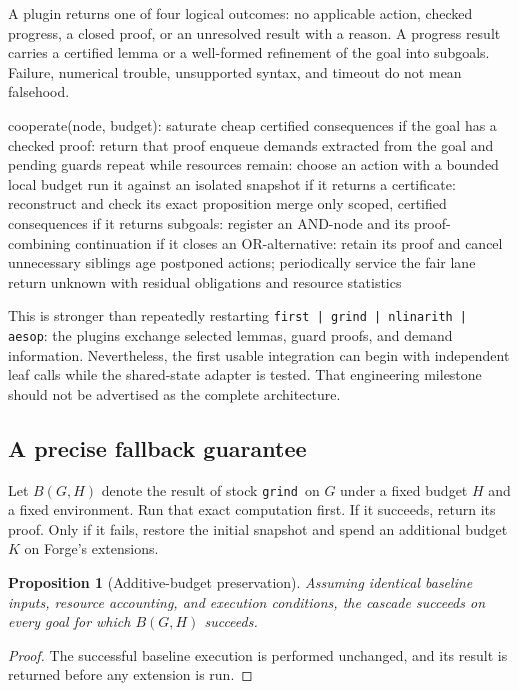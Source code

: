 \documentclass[11pt,a4paper]{article}
\newcommand{\grind}{\texttt{grind}}
\newcommand{\code}[1]{\texttt{\small #1}}
\newtheorem{proposition}{Proposition}[section]
\begin{document}
A plugin returns one of four logical outcomes: no applicable action, checked
progress, a closed proof, or an unresolved result with a reason. A progress
result carries a certified lemma or a well-formed refinement of the goal into
subgoals. Failure, numerical trouble, unsupported syntax, and timeout do not
mean falsehood.

\begin{Code}
cooperate(node, budget):
  saturate cheap certified consequences
  if the goal has a checked proof: return that proof
  enqueue demands extracted from the goal and pending guards
  repeat while resources remain:
    choose an action with a bounded local budget
    run it against an isolated snapshot
    if it returns a certificate:
      reconstruct and check its exact proposition
      merge only scoped, certified consequences
    if it returns subgoals:
      register an AND-node and its proof-combining continuation
    if it closes an OR-alternative:
      retain its proof and cancel unnecessary siblings
    age postponed actions; periodically service the fair lane
  return unknown with residual obligations and resource statistics
\end{Code}

This is stronger than repeatedly restarting \code{first | grind | nlinarith |
aesop}: the plugins exchange selected lemmas, guard proofs, and demand
information. Nevertheless, the first usable integration can begin with
independent leaf calls while the shared-state adapter is tested. That
engineering milestone should not be advertised as the complete architecture.

\subsection{A precise fallback guarantee}

Let $B(G,H)$ denote the result of stock \grind\ on $G$ under a fixed budget
$H$ and a fixed environment. Run that exact computation first. If it succeeds,
return its proof. Only if it fails, restore the initial snapshot and spend an
additional budget $K$ on Forge's extensions.

\begin{proposition}[Additive-budget preservation]
Assuming identical baseline inputs, resource accounting, and execution
conditions, the cascade succeeds on every goal for which $B(G,H)$ succeeds.
\end{proposition}
\begin{proof}
The successful baseline execution is performed unchanged, and its result is
returned before any extension is run.
\end{proof}
\end{document}

